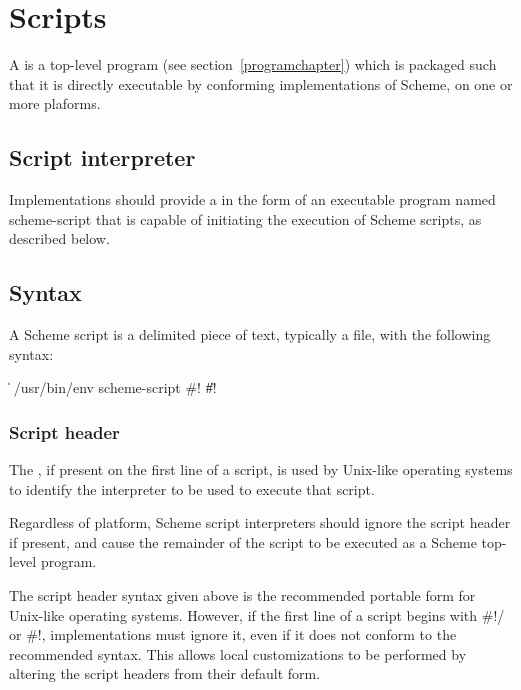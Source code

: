 \chapter{Scripts}
\label{scriptappendix}

A  is a top-level program 
(see section~\ref{programchapter}) which is packaged such that 
it is directly executable by conforming implementations of Scheme, on 
one or more plaforms.

\section{Script interpreter}

Implementations should provide a  in 
the form of an executable program named {\cf scheme-script} that is 
capable of initiating the execution of Scheme scripts, as described 
below.

\section{Syntax}

A Scheme script is a delimited piece of text, typically a file, with 
the following syntax:

\begin{grammar}
 \:  
  \> \| 
 \:  /usr/bin/env  
  \> scheme-script 
 \: \#! \| \#! 
\end{grammar}

\subsection{Script header}

The , if present on the first line of a script,
is used by Unix-like operating systems to identify the interpreter to 
be used to execute that script.

Regardless of platform, Scheme script interpreters should ignore the  
script header if present, and cause the remainder of the script to be 
executed as a Scheme top-level program.

The script header syntax given above is the recommended portable 
form for Unix-like operating systems.  However, if the first line 
of a script begins with {\cf \#!/} or {\cf \#!}, 
implementations must ignore it, even if it does not conform to 
the recommended syntax.  This allows local customizations to be 
performed by altering the script headers from their default form.

